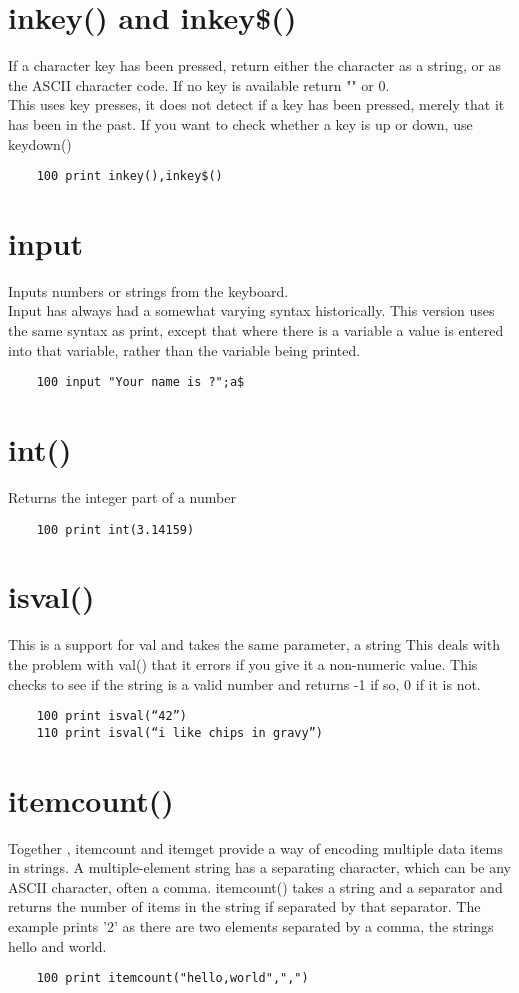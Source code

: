 \section*{inkey() and inkey\$()}
If a character key has been pressed, return either the character as a string, or as the ASCII character code. If no key is available return "" or 0.\\
This uses key presses, it does not detect if a key has been pressed, merely that it has been in the past. If you want to check whether a key is up or down, use keydown()
\example{}
\begin{verbatim}
	100 print inkey(),inkey$()
\end{verbatim}

\section*{input}
Inputs numbers or strings from the keyboard. \\
Input has always had a somewhat varying syntax historically. This version uses the same syntax as print, except that where there is a variable a value is entered into that variable, rather than the variable being printed.
\example{}
\begin{verbatim}
	100 input "Your name is ?";a$
\end{verbatim}

\section*{int()}
Returns the integer part of a number
\example{}
\begin{verbatim}
	100 print int(3.14159)
\end{verbatim}

\section*{isval()}
This is a support for val and takes the same parameter, a string  This deals with the problem with val() that it errors if you give it a non-numeric value. This checks to see if the string is a valid number  and returns -1 if so, 0 if it is not.
\example{}
\begin{verbatim}
	100 print isval(“42”)
	110 print isval(“i like chips in gravy”)
\end{verbatim}

\section*{itemcount()}
Together , itemcount and itemget provide a way of encoding multiple data items in strings. A multiple-element string has a separating character, which can be any ASCII character, often a comma. 
itemcount() takes a string and a separator and returns the number of items in the string if separated by that separator. The example prints '2' as there are two elements separated by a comma, the strings hello and world.
\example{}
\begin{verbatim}
	100 print itemcount("hello,world",",")
\end{verbatim}

